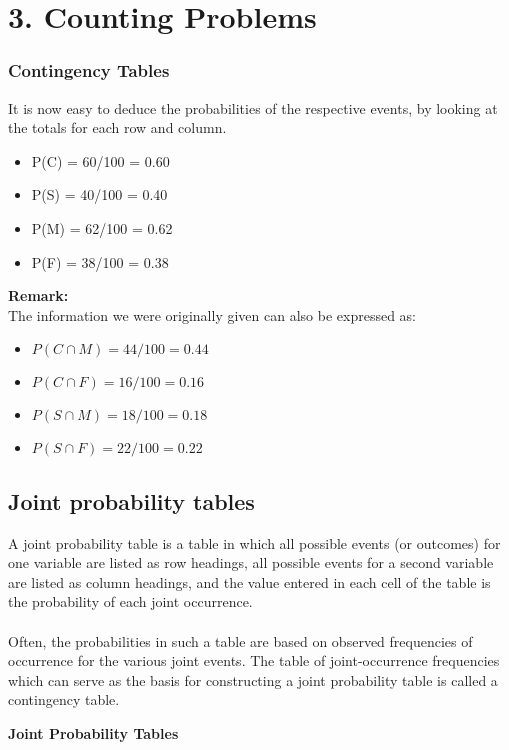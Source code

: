 \newpage
\chapter{3. Counting Problems}
\subsection{Contingency Tables}
It is now easy to deduce the probabilities of the respective events, by looking at the totals for each row and column.
\begin{itemize}
\item P(C) = 60/100 = 0.60
\item P(S) = 40/100 = 0.40
\item P(M) = 62/100 = 0.62
\item P(F) = 38/100 = 0.38
\end{itemize}
\textbf{Remark:}\\
The information we were originally given can also be expressed as:
\begin{itemize}
\item $P(C \cap M) = 44/100 = 0.44$
\item $P(C \cap F) = 16/100 = 0.16$
\item $P(S \cap M) = 18/100 = 0.18$
\item $P(S \cap F) = 22/100 = 0.22$
\end{itemize}

	
	\section{Joint probability tables}
	A joint probability table is a table in which all possible events (or outcomes) for one variable are listed as
	row headings, all possible events for a second variable are listed as column headings, and the value entered in
	each cell of the table is the probability of each joint occurrence. 
	\\
	\\
	\noindent Often, the probabilities in such a table are based
	on observed frequencies of occurrence for the various joint events. The table
	of joint-occurrence frequencies which can serve as the basis for constructing a joint probability table is called a
	contingency table.

\noindent \textbf{Joint Probability Tables}

